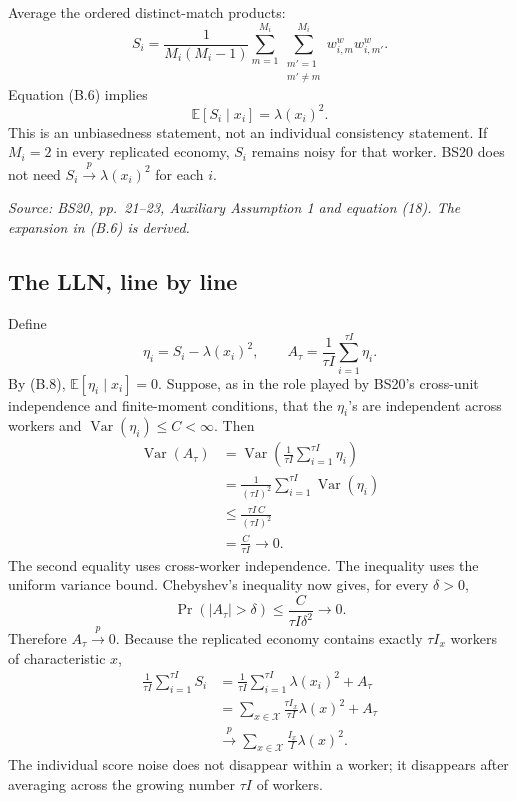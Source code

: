 \documentclass[11pt]{article}
\begin{document}
Average the ordered distinct-match products:
\[
S_i
=
\frac{1}{M_i(M_i-1)}
\sum_{m=1}^{M_i}
\sum_{\substack{m'=1\\m'\neq m}}^{M_i}
w^w_{i,m}w^w_{i,m'}.
\tag{B.7}
\]
Equation (B.6) implies
\[
\mathbb E[S_i\mid x_i]=\lambda(x_i)^2.
\tag{B.8}
\]
This is an unbiasedness statement, not an individual consistency statement.
If \(M_i=2\) in every replicated economy, \(S_i\) remains noisy for that
worker.  BS20 does not need \(S_i\overset p\longrightarrow\lambda(x_i)^2\)
for each \(i\).

\textit{Source: BS20, pp.\ 21--23, Auxiliary Assumption 1 and equation
(18).  The expansion in (B.6) is derived.}

\subsection{The LLN, line by line}

Define
\[
\eta_i=S_i-\lambda(x_i)^2,
\qquad
A_\tau=\frac{1}{\tau I}\sum_{i=1}^{\tau I}\eta_i.
\tag{B.9}
\]
By (B.8), \(\mathbb E[\eta_i\mid x_i]=0\).  Suppose, as in the role played
by BS20's cross-unit independence and finite-moment conditions, that the
\(\eta_i\)'s are independent across workers and
\(\operatorname{Var}(\eta_i)\leq C<\infty\).  Then
\[
\begin{aligned}
\operatorname{Var}(A_\tau)
&=
\operatorname{Var}\left(
\frac{1}{\tau I}\sum_{i=1}^{\tau I}\eta_i
\right)\\
&=
\frac{1}{(\tau I)^2}
\sum_{i=1}^{\tau I}\operatorname{Var}(\eta_i)\\
&\leq
\frac{\tau I\,C}{(\tau I)^2}\\
&=
\frac{C}{\tau I}
\longrightarrow 0.
\end{aligned}
\tag{B.10}
\]
The second equality uses cross-worker independence.  The inequality uses
the uniform variance bound.  Chebyshev's inequality now gives, for every
\(\delta>0\),
\[
\Pr(|A_\tau|>\delta)
\leq
\frac{C}{\tau I\delta^2}
\longrightarrow0.
\tag{B.11}
\]
Therefore \(A_\tau\overset p\longrightarrow0\).  Because the replicated
economy contains exactly \(\tau I_x\) workers of characteristic \(x\),
\[
\begin{aligned}
\frac{1}{\tau I}\sum_{i=1}^{\tau I}S_i
&=
\frac{1}{\tau I}\sum_{i=1}^{\tau I}\lambda(x_i)^2+A_\tau\\
&=
\sum_{x\in\mathcal X}\frac{\tau I_x}{\tau I}\lambda(x)^2+A_\tau\\
&\overset p\longrightarrow
\sum_{x\in\mathcal X}\frac{I_x}{I}\lambda(x)^2.
\end{aligned}
\tag{B.12}
\]
The individual score noise does not disappear within a worker; it disappears
after averaging across the growing number \(\tau I\) of workers.
\end{document}
